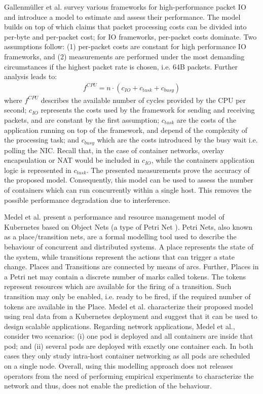 \documentclass[conference]{IEEEtran}
\begin{document}
Gallenmüller et al. \cite{ANCS:Gallenmüller} survey various frameworks for high-performance packet IO and introduce a model to estimate and assess their performance. The model builds on top of \cite{Rizzo:2012} which claims that packet processing costs can be divided into per-byte and per-packet cost; for IO frameworks, per-packet costs dominate. Two assumptions follow: (1) per-packet costs are constant for high performance IO frameworks, and (2) measurements are performed under the most demanding circumstances if the highest packet rate is chosen, i.e. 64B packets. Further analysis leads to:
\begin{align}
f^{CPU} = n \cdot (c_{IO}+c_{task}+c_{busy})
\end{align}
\noindent where $f^{CPU}$ describes the available number of cycles provided by the CPU per second; $c_{IO}$ represents the costs used by the framework for sending and receiving packets, and are constant by the first assumption; $c_{task}$ are the costs of the application running on top of the framework, and depend of the complexity of the processing task; and $c_{busy}$ which are the costs introduced by the busy wait i.e. polling the NIC. Recall that, in the case of container networks, overlay encapsulation or NAT would be included in $c_{IO}$, while the containers application logic is represented in $c_{task}$.
The presented measurements prove the accuracy of the proposed model. Consequently, this model can be used to assess the number of containers which can run concurrently within a single host. This removes the possible performance degradation due to interference.

Medel et al. \cite{UCC_2016:Medel} present a performance and resource management model of Kubernetes based on Object Nets \cite{ObjectNets} (a type of Petri Net \cite{PetriNets}). Petri Nets, also known as a place/transition nets, are a formal modelling tool used to describe the behaviour of concurrent and distributed systems. A place represents the state of the system, while transitions represent the actions that can trigger a state change. Places and Transitions are connected by means of arcs. Further, Places in a Petri net may contain a discrete number of marks called tokens. The tokens represent resources which are available for the firing of a transition. Such transition may only be enabled, i.e. ready to be fired, if the required number of tokens are available in the Place. Medel et al. characterize their proposed model using real data from a Kubernetes deployment and suggest that it can be used to design scalable applications. Regarding network applications, Medel et al., consider two scenarios: (i) one pod is deployed and all containers are inside that pod; and (ii) several pods are deployed with exactly one container each. In both cases they only study intra-host container networking as all pods are scheduled on a single node. Overall, using this modelling approach does not releases operators from the need of performing empirical experiments to characterize the network and thus, does not enable the prediction of the behaviour.
\end{document}
